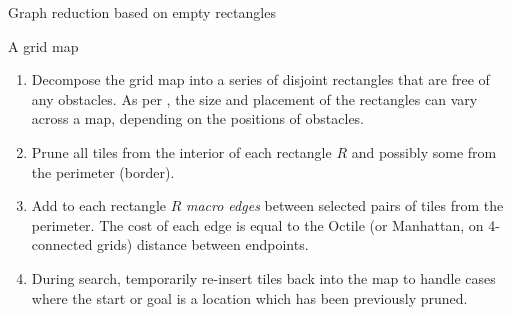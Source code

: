 \begin{algorithm}
\caption{Graph reduction based on empty rectangles}
\label{alg:rsr}
\begin{algorithmic}
\REQUIRE A grid map 
\begin{enumerate}
\item{\label{alg:rsr:1} Decompose the grid map into a series of disjoint rectangles that are free of any obstacles.
As per \cite{harabor10}, the size and placement of the rectangles can vary across a
map, depending on the positions of obstacles.}
\item{\label{alg:rsr:2} Prune all tiles from the interior of each rectangle $R$
and possibly some from the perimeter (border).}
\item{\label{alg:rsr:3} Add to each rectangle $R$ \emph{macro edges} between 
selected pairs of tiles from the perimeter. The cost of each edge is equal to
the Octile (or Manhattan, on 4-connected grids) distance between endpoints.}
\item{\label{alg:rsr:4} During search, temporarily re-insert tiles back into the map to handle cases where the
start or goal is a location which has been previously pruned.}
\end{enumerate}
\end{algorithmic}
\end{algorithm}
